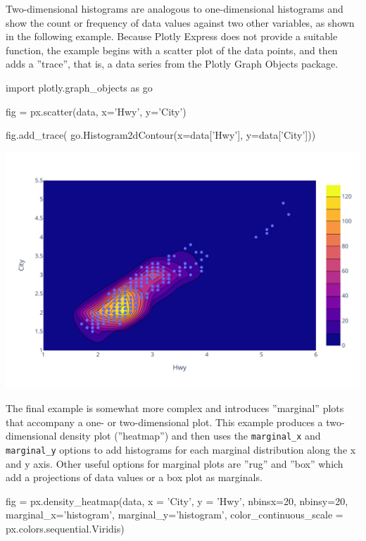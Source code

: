 Two-dimensional histograms  are analogous to one-dimensional histograms and show the count or frequency of data values against two other variables, as shown in the following example. Because Plotly Express does not provide a suitable function, the example begins with a scatter plot of the data points, and then adds a ''trace'', that is, a data series from the Plotly Graph Objects package. 

\begin{pythoncode}
import plotly.graph_objects as go

fig = px.scatter(data, x='Hwy', y='City')

fig.add_trace(
  go.Histogram2dContour(x=data['Hwy'], y=data['City']))
\end{pythoncode}

\begin{center}
  \includegraphics[width=.8\textwidth]{px.fuel.density2d.pdf}
\end{center}

The final example is somewhat more complex and introduces ''marginal'' plots that accompany a one- or two-dimensional plot. This example produces a two-dimensional density plot (''heatmap'') and then uses the \texttt{marginal\_x} and \texttt{marginal\_y} options to add histograms for each marginal distribution along the x and y axis. Other useful options for marginal plots are ''rug'' and ''box'' which add a projections of data values or a box plot as marginals. 

\begin{pythoncode}
fig = px.density_heatmap(data,
  x = 'City', y = 'Hwy',
  nbinsx=20, nbinsy=20,
  marginal_x='histogram', marginal_y='histogram',
  color_continuous_scale = px.colors.sequential.Viridis)
\end{pythoncode}

